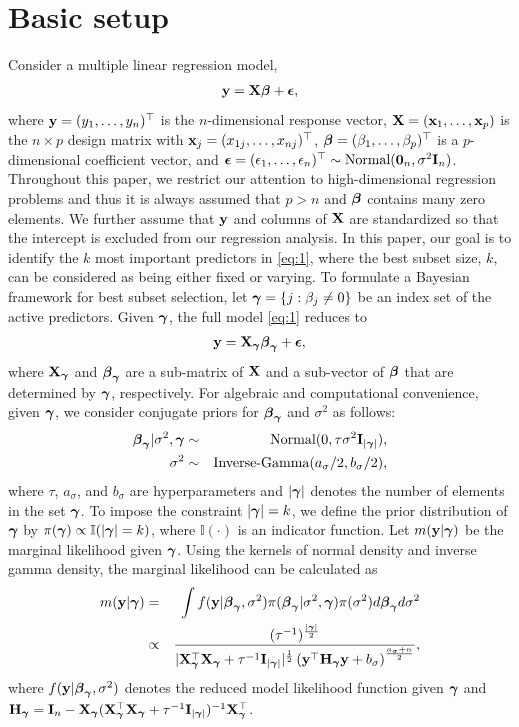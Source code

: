 \section{Basic setup}\label{sec:2}
Consider a multiple linear regression model,
\begin{eqnarray}\label{eq:1}
{\bf y} = {\bf X}{\boldsymbol \beta} + {\boldsymbol \epsilon},
\end{eqnarray}
where ${\bf y}=(y_1,\ldots,y_n)^{ \top} $ is the $n$-dimensional response vector, ${\bf X} = ({\bf x}_1,\ldots,{\bf x}_p)$ is the $n\times p$ design matrix with ${\bf x}_j=(x_{1j},\ldots, x_{nj})^{ \top}$, ${\boldsymbol \beta} = (\beta_1,\ldots,\beta_p)^{{ \top}}$ is a $p$-dimensional coefficient vector, and ${\boldsymbol \epsilon}=(\epsilon_1,\ldots,\epsilon_n)^{ \top} \sim \text{Normal}({\boldsymbol 0}_n, \sigma^2{\bf I}_n)$. Throughout this paper, we restrict our attention to high-dimensional regression problems and thus it is always assumed that $p>n$ and ${\boldsymbol \beta}$ contains many zero elements. We further assume that ${\bf y}$ and columns of ${\bf X}$ are standardized so that the intercept is excluded from our regression analysis. In this paper, our goal is to identify the $k$ most important predictors in \eqref{eq:1}, where the best subset size, $k$, can be considered as being either fixed or varying. To formulate a Bayesian framework for best subset selection, let ${\boldsymbol \gamma}=\{j:\beta_j\neq 0\}$ be an index set of the active predictors. Given ${\boldsymbol \gamma}$, the full model \eqref{eq:1} reduces  to
\begin{eqnarray*}
{\bf y} = {\bf X}_{{\boldsymbol \gamma}} {\boldsymbol \beta}_{{\boldsymbol \gamma}} + {\boldsymbol \epsilon},
\end{eqnarray*}
where ${\bf X}_{{\boldsymbol \gamma}}$ and ${\boldsymbol \beta}_{{\boldsymbol \gamma}}$ are a sub-matrix of ${\bf X}$ and a sub-vector of ${\boldsymbol \beta}$ that are determined by ${\boldsymbol \gamma}$, respectively. For algebraic and computational convenience, given ${\boldsymbol \gamma}$, we consider conjugate priors for ${\boldsymbol \beta}_{{\boldsymbol \gamma}}$ and $\sigma^2$ as follows:
\begin{eqnarray*}
	{\boldsymbol \beta}_{{\boldsymbol \gamma}}|\sigma^2,{\boldsymbol \gamma} &\sim&\text{Normal}(0,\tau \sigma^2 {\bf I}_{|{\boldsymbol \gamma}|} ),\\
	\sigma^2 &\sim& \text{Inverse-Gamma}(a_{\sigma}/2,b_{\sigma}/2),
\end{eqnarray*} 
where $\tau$, $a_{\sigma}$, and $b_{\sigma}$ are hyperparameters and $|{\boldsymbol \gamma}|$ denotes the number of elements in the set ${\boldsymbol \gamma}$. To impose the constraint $|{\boldsymbol \gamma}|=k$, we define the prior distribution of ${\boldsymbol \gamma}$ by $\pi({\boldsymbol \gamma})\propto\mathbb{I}(|{\boldsymbol \gamma}|=k )$, where $\mathbb{I}(\cdot)$ is an indicator function. Let $m({\bf y}|{\boldsymbol \gamma})$ be the marginal likelihood given ${\boldsymbol \gamma}$. Using the kernels of normal density and inverse gamma density, the marginal likelihood can be calculated as
\begin{eqnarray}
\label{eq:2} m({\bf y}|{\boldsymbol \gamma}) &=&\int f({\bf y}|{\boldsymbol \beta}_{{\boldsymbol \gamma}},\sigma^2)\pi({\boldsymbol \beta}_{{\boldsymbol \gamma}}|\sigma^2, {\boldsymbol \gamma}) \pi(\sigma^2) d{\boldsymbol \beta}_{\boldsymbol \gamma} d\sigma^2 \nonumber \\
&\propto& \frac{(\tau^{-1})^{\frac{|{\boldsymbol \gamma}|}{2}}}{|{\bf X}_{{\boldsymbol \gamma}}^{{ \top}}
		{\bf X}_{{\boldsymbol \gamma}}+\tau^{-1}{\bf I}_{|{\boldsymbol \gamma}|} |^{\frac{1}{2}}  \left({\bf y}^{{ \top}}{\bf H}_{{\boldsymbol \gamma}}
	{\bf y}+b_{\sigma}\right)^{\frac{a_{\sigma}+n}{2}  } },
\end{eqnarray}
where $f({\bf y}|{\boldsymbol \beta}_{{\boldsymbol \gamma}},\sigma^2)$ denotes the reduced model likelihood function given ${\boldsymbol \gamma}$ and ${\bf H}_{{\boldsymbol \gamma}} = {\bf I}_n-{\bf X}_{{\boldsymbol \gamma}}({\bf X}_{{\boldsymbol \gamma}}^{{ \top}}{\bf X}_{{\boldsymbol \gamma}}+\tau^{-1}{\bf I}_{|{\boldsymbol \gamma}|})^{-1}{\bf X}_{{\boldsymbol \gamma}}^{{ \top}}$. 

